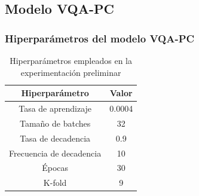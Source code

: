 \subsection{Modelo VQA-PC}
\begin{frame}
  \frametitle{Hiperparámetros del modelo VQA-PC\footnotemark[12]}
  \begin{table}[htp]
    \small
    \begin{center}
      \begin{tabular}[c]{|c|c|}
        \hline
        \rowcolor[HTML]{FFC702}
        \textbf{Hiperparámetro} & \textbf{Valor} \\ 
        \hline 
        Tasa de aprendizaje &  0.0004 \\ 
        \hline 
        Tamaño de batches & 32 \\ 
        \hline 
        Tasa de decadencia & 0.9 \\ 
        \hline 
        Frecuencia de decadencia & 10 \\ 
        \hline 
        Épocas & 30 \\ 
        \hline 
        K-fold & 9 \\ 
        \hline 
      \end{tabular}
    \end{center}
    \caption[Hiperparámetros empleados en la experimentación preliminar.]{
      Hiperparámetros empleados en la experimentación preliminar\footnotemark[12]
    }
      \vspace{-.6cm}
    \label{tab:HiperSJTU}
  \end{table}
\end{frame}

